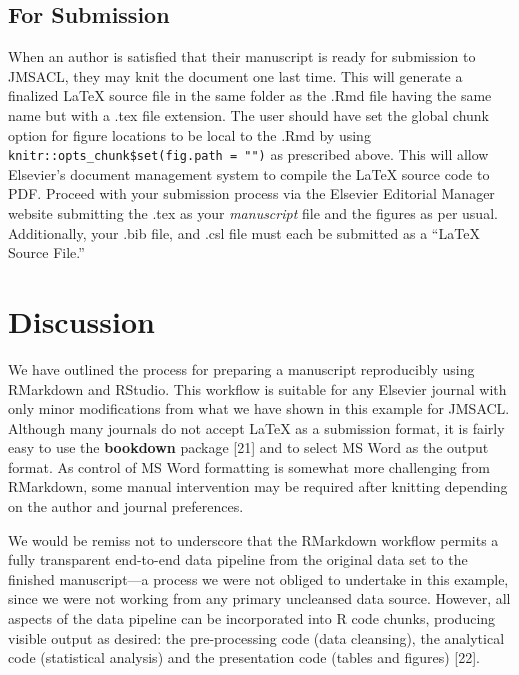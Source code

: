 \documentclass[]{elsarticle} %
\begin{document}
\hypertarget{for-submission}{%
\subsection{For Submission}\label{for-submission}}

When an author is satisfied that their manuscript is ready for
submission to JMSACL, they may knit the document one last time. This
will generate a finalized LaTeX source file in the same folder as the
.Rmd file having the same name but with a .tex file extension. The user
should have set the global chunk option for figure locations to be local
to the .Rmd by using \texttt{knitr::opts\_chunk\$set(fig.path\ =\ "")}
as prescribed above. This will allow Elsevier's document management
system to compile the LaTeX source code to PDF. Proceed with your
submission process via the Elsevier Editorial Manager website submitting
the .tex as your \emph{manuscript} file and the figures as per usual.
Additionally, your .bib file, and .csl file must each be submitted as a
``LaTeX Source File.''

\hypertarget{discussion}{%
\section{Discussion}\label{discussion}}

We have outlined the process for preparing a manuscript reproducibly
using RMarkdown and RStudio. This workflow is suitable for any Elsevier
journal with only minor modifications from what we have shown in this
example for JMSACL. Although many journals do not accept LaTeX as a
submission format, it is fairly easy to use the \textbf{bookdown}
package {[}21{]} and to select MS Word as the output format. As control
of MS Word formatting is somewhat more challenging from RMarkdown, some
manual intervention may be required after knitting depending on the
author and journal preferences.

We would be remiss not to underscore that the RMarkdown workflow permits
a fully transparent end-to-end data pipeline from the original data set
to the finished manuscript---a process we were not obliged to undertake
in this example, since we were not working from any primary uncleansed
data source. However, all aspects of the data pipeline can be
incorporated into R code chunks, producing visible output as desired:
the pre-processing code (data cleansing), the analytical code
(statistical analysis) and the presentation code (tables and figures)
{[}22{]}.
\end{document}
